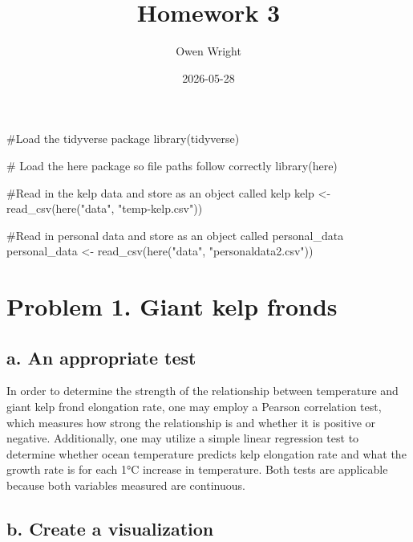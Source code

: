 \documentclass[
  letterpaper,
  DIV=11,
  numbers=noendperiod]{scrartcl}
\title{Homework 3}
\author{Owen Wright}
\date{2026-05-28}
\newenvironment{Shaded}{\begin{snugshade}}{\end{snugshade}}
\newcommand{\CommentTok}[1]{\textcolor[rgb]{0.37,0.37,0.37}{#1}}
\newcommand{\FunctionTok}[1]{\textcolor[rgb]{0.28,0.35,0.67}{#1}}
\newcommand{\NormalTok}[1]{\textcolor[rgb]{0.00,0.23,0.31}{#1}}
\newcommand{\OtherTok}[1]{\textcolor[rgb]{0.00,0.23,0.31}{#1}}
\newcommand{\StringTok}[1]{\textcolor[rgb]{0.13,0.47,0.30}{#1}}
\renewcommand*\contentsname{Table of contents}
\newcommand\contentsname{Table of contents}
\begin{document}
\maketitle

\renewcommand*\contentsname{Table of contents}
{
\hypersetup{linkcolor=}
\setcounter{tocdepth}{3}
\tableofcontents
}

\begin{Shaded}
\begin{Highlighting}[]
\CommentTok{\#Load the tidyverse package}
\FunctionTok{library}\NormalTok{(tidyverse)}

\CommentTok{\# Load the here package so file paths follow correctly}
\FunctionTok{library}\NormalTok{(here)}

\CommentTok{\#Read in the kelp data and store as an object called kelp}
\NormalTok{kelp }\OtherTok{\textless{}{-}} \FunctionTok{read\_csv}\NormalTok{(}\FunctionTok{here}\NormalTok{(}\StringTok{"data"}\NormalTok{, }\StringTok{"temp{-}kelp.csv"}\NormalTok{))}

\CommentTok{\#Read in personal data and store as an object called personal\_data}
\NormalTok{personal\_data }\OtherTok{\textless{}{-}} \FunctionTok{read\_csv}\NormalTok{(}\FunctionTok{here}\NormalTok{(}\StringTok{"data"}\NormalTok{, }\StringTok{"personaldata2.csv"}\NormalTok{))}
\end{Highlighting}
\end{Shaded}

\section{Problem 1. Giant kelp
fronds}\label{problem-1.-giant-kelp-fronds}

\subsection{a. An appropriate test}\label{a.-an-appropriate-test}

In order to determine the strength of the relationship between
temperature and giant kelp frond elongation rate, one may employ a
Pearson correlation test, which measures how strong the relationship is
and whether it is positive or negative. Additionally, one may utilize a
simple linear regression test to determine whether ocean temperature
predicts kelp elongation rate and what the growth rate is for each 1°C
increase in temperature. Both tests are applicable because both
variables measured are continuous.

\subsection{b. Create a visualization}\label{b.-create-a-visualization}
\end{document}
